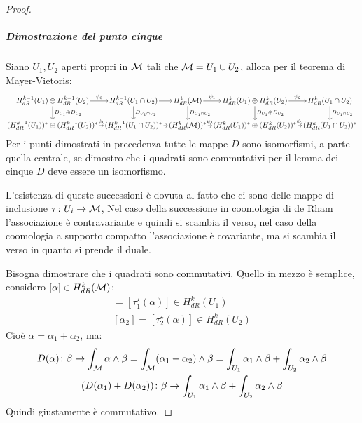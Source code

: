 \begin{proof}
  \subparagraph{Dimostrazione del punto cinque} Siano $ U_1, U_2 $ aperti propri
  in $ \mathcal{M} $ tali che $ \mathcal{M} = U_1 \cup U_2 $, allora per il teorema di Mayer-Vietoris:
  \[
    \begin{tikzcd}[nodes = {column sep = 6 pt, inner sep = 1.5pt}]
       H_{dR}^{k-1}(U_1) \oplus H_{dR}^{k-1}(U_2) \rar{\psi_0} \dar{D_{U_1} \oplus D_{U_2}} & H^{k-1}_{dR}(U_1 \cap U_2) \dar{D_{U_1 \cap U_2}} \rar &H^k_{dR}(\M) \rar{\psi_1} \dar{D_{U_1 \cap U_2}} & H_{dR}^{k}(U_1) \oplus H_{dR}^{k}(U_2) \rar{\psi_2}  \dar{D_{U_1} \oplus D_{U_2}} & H^k_{dR}(U_1 \cap U_2) \dar{D_{U_1 \cap U_2}}  \\
       (H_{dR}^{k-1}(U_1))^* \oplus (H_{dR}^{k-1}(U_2))^* \rar{\psi_0} & (H^{k-1}_{dR}(U_1 \cap U_2))^* \rar  &(H^k_{dR}(\M))^* \rar{\psi_1} & (H_{dR}^{k}(U_1))^* \oplus (H_{dR}^{k}(U_2))^* \rar{\psi_2} & (H^k_{dR}(U_1 \cap U_2))^*
    \end{tikzcd}
  \]
  Per i punti dimostrati in precedenza tutte le mappe $ D $ sono isomorfismi, a parte
  quella centrale, se dimostro che i quadrati sono commutativi per il lemma dei cinque
  $ D $ deve essere un isomorfismo.
  \begin{osservation}
    L'esistenza di queste successioni è dovuta al fatto che ci sono delle mappe
    di inclusione $ \tau \colon U_i \to \mathcal{M} $, Nel caso della successione in coomologia di
    de Rham l'associazione è contravariante e quindi si scambia il verso, nel caso
    della coomologia a supporto compatto l'associazione è covariante, ma si scambia il verso
    in quanto si prende il duale.
  \end{osservation}
  Bisogna dimostrare che i quadrati sono commutativi. Quello in mezzo è semplice,
  considero $ [\alpha] \in H^k_{dR}(\mathcal{M}) $:
  \begin{gather*}
    [\alpha_1] = [\tau_1^\star(\alpha)] \in H^k_{dR}(U_1) \\
    [\alpha_2] = [\tau_2^\star(\alpha)] \in H^k_{dR}(U_2)
  \end{gather*}
  Cioè $ \alpha = \alpha_1 + \alpha_2 $, ma:
  \begin{gather*}
    D(\alpha) \colon \beta \to \int_{\mathcal{M}} \alpha \wedge \beta =  \int_{\mathcal{M}} (\alpha_1 + \alpha_2) \wedge \beta =  \int_{U_1} \alpha_1 \wedge \beta + \int_{U_2} \alpha_2 \wedge \beta \\
    (D(\alpha_1) + D(\alpha_2)) \colon \beta \to  \int_{U_1} \alpha_1 \wedge \beta +  \int_{U_2} \alpha_2 \wedge \beta
  \end{gather*}
  Quindi giustamente è commutativo.
\end{proof}

